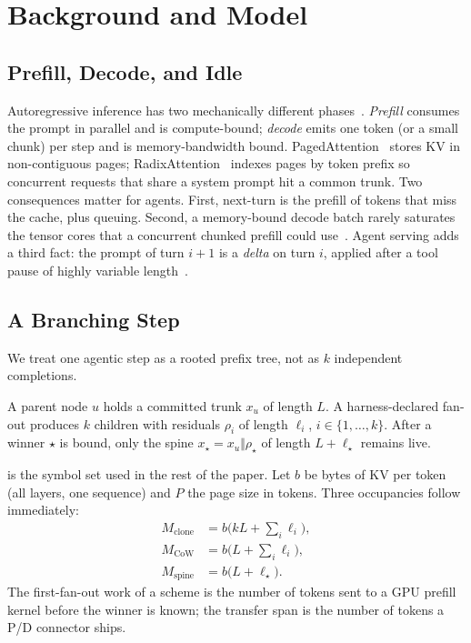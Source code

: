 \section{Background and Model}
\label{sec:problem}

\subsection{Prefill, Decode, and Idle}
Autoregressive inference has two mechanically different phases~\cite{orca,distserve,splitwise}.
\emph{Prefill} consumes the prompt in parallel and is compute-bound; \emph{decode} emits one token (or a small chunk) per step and is memory-bandwidth bound.
PagedAttention~\cite{vllm} stores KV in non-contiguous pages; RadixAttention~\cite{sglang} indexes pages by token prefix so concurrent requests that share a system prompt hit a common trunk.
Two consequences matter for agents.
First, next-turn \ttft{} is the prefill of tokens that miss the cache, plus queuing.
Second, a memory-bound decode batch rarely saturates the tensor cores that a concurrent chunked prefill could use~\cite{sarathi}.
Agent serving adds a third fact: the prompt of turn $i{+}1$ is a \emph{delta} on turn $i$, applied after a tool pause of highly variable length~\cite{continuum,mori}.

\subsection{A Branching Step}
\label{sec:model}
We treat one agentic step as a rooted prefix tree, not as $k$ independent completions.

\begin{definition}
A parent node $u$ holds a committed trunk $x_u$ of length $L$.
A harness-declared fan-out produces $k$ children with residuals $\rho_i$ of length $\ell_i$, $i\in\{1,\ldots,k\}$.
After a winner $\star$ is bound, only the spine $x_\star=x_u\Vert\rho_\star$ of length $L+\ell_\star$ remains live.
\end{definition}

 is the symbol set used in the rest of the paper.
Let $b$ be bytes of KV per token (all layers, one sequence) and $P$ the page size in tokens.
Three occupancies follow immediately:
\begin{align}
M_{\mathrm{clone}} &= b\bigl(kL+\textstyle\sum_i\ell_i\bigr), \label{eq:mem}\\
M_{\mathrm{CoW}} &= b\bigl(L+\textstyle\sum_i\ell_i\bigr), \nonumber\\
M_{\mathrm{spine}} &= b\bigl(L+\ell_\star\bigr). \nonumber
\end{align}
The first-fan-out work of a scheme is the number of tokens sent to a GPU prefill kernel before the winner is known; the transfer span is the number of tokens a P/D connector ships.

